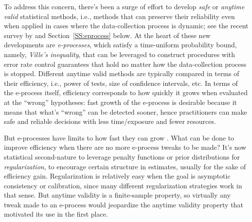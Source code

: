 \documentclass[a4paper, 12pt]{article}
\theoremstyle{plain}
\theoremstyle{definition}
\theoremstyle{remark}
\begin{document}
To address this concern, there's been a surge of effort to develop {\em safe} or {\em anytime valid} statistical methods, i.e., methods that can preserve their reliability even when applied in cases where the data-collection process is dynamic; see the recent survey by \citet{evalues.review} and Section~\ref{SS:eprocess} below.  At the heart of these new developments are {\em e-processes}, which satisfy a time-uniform probability bound, namely, {\em Ville's inequality}, that can be leveraged to construct procedures with error rate control guarantees that hold no matter how the data-collection process is stopped.  
Different anytime valid methods are typically compared in terms of their efficiency, i.e., power of tests, size of confidence intervals, etc.  In terms of the e-process itself, efficiency corresponds to how quickly it grows when evaluated at the ``wrong'' hypotheses: fast growth of the e-process is desirable because it means that what's ``wrong'' can be detected sooner, hence practitioners can make safe and reliable decisions with less time/exposure and fewer resources.   

But e-processes have limits to how fast they can grow \citep[e.g.,][]{grunwald.safetest}.  What can be done to improve efficiency when there are no more e-process tweaks to be made? It's now statistical second-nature to leverage penalty functions or prior distributions for {\em regularization}, to encourage certain structure in estimates, usually for the sake of efficiency gain.  Regularization is relatively easy when the goal is asymptotic consistency or calibration, since many different regularization strategies work in that sense. But anytime validity is a finite-sample property, so virtually any tweak made to an e-process would jeopardize the anytime validity property that motivated its use in the first place.  
\end{document}

